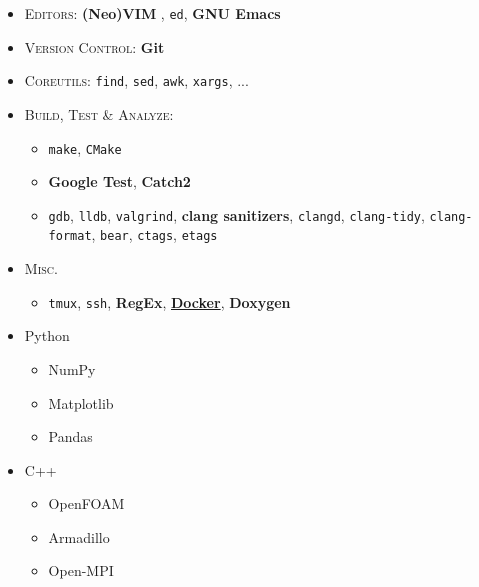 %
%
%

\twocolumnsection
{
\begin{skills}
\end{skills}}
{
\vspace{1em}
\begin{itemize}
  \item \textsc{Editors}: \textbf{(Neo)VIM} , \texttt{ed}, \textbf{GNU Emacs}
  \item \textsc{Version Control}: \textbf{Git}
  \item \textsc{Coreutils}: \texttt{find}, \texttt{sed}, \texttt{awk}, \texttt{xargs}, ...
  \item \textsc{Build, Test \& Analyze}:
    \begin{itemize}
      \item \texttt{make}, \texttt{CMake}
      \item \textbf{Google Test}, \textbf{Catch2}
      \item \texttt{gdb}, \texttt{lldb}, \texttt{valgrind}, \textbf{clang sanitizers}, \texttt{clangd}, \texttt{clang-tidy}, \texttt{clang-format}, \texttt{bear}, \texttt{ctags}, \texttt{etags}
    \end{itemize}
  \item \textsc{Misc.}
    \begin{itemize}
      \item \texttt{tmux},
      \texttt{ssh},
      \textbf{RegEx},
      \href{https://gist.github.com/reverseila/33d9173c872fb34efa055326859b0c5b}{\color{basecolor} \textbf{Docker}},
      \textbf{Doxygen}
    \end{itemize}
\end{itemize}
}

{
\vspace{1em}
  \begin{itemize}
    \item Python
      \begin{itemize}
        \item NumPy
        \item Matplotlib
        \item Pandas
      \end{itemize}
    \item C++
      \begin{itemize}
        \item OpenFOAM
        \item Armadillo
        \item Open-MPI
      \end{itemize}
  \end{itemize}
}

